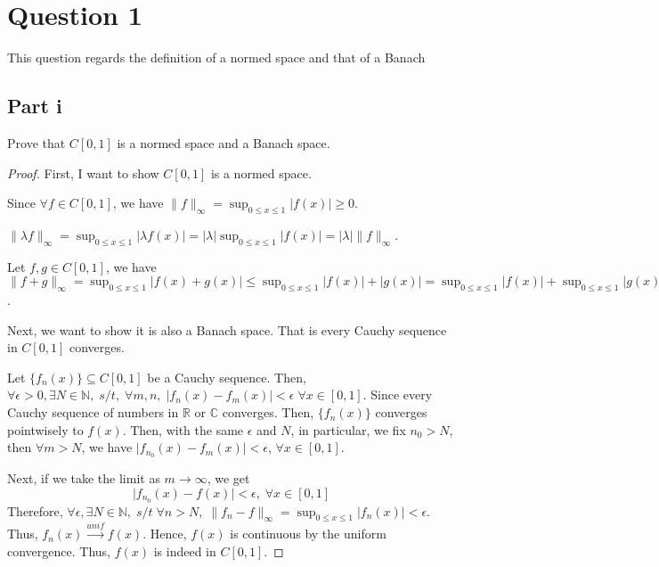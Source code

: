 \section{Question 1}

\begin{question}
    This question regards the definition of a normed space and that of a Banach
\end{question}

\subsection{Part i}

\begin{question}
    Prove that $C[0,1]$ is a normed space and a Banach space.
\end{question}

\begin{answer}
    \begin{proof}
        First, I want to show $C[0,1]$ is a normed space. 
        
        Since $\forall f \in C[0,1]$, we have $\lVert f \rVert_{\infty} = \sup_{0 \leq x \leq 1} \lvert f(x) \rvert \geq 0$.
        
        $\lVert \lambda f \rVert_{\infty} = \sup_{0 \leq x \leq 1}\lvert \lambda f(x) \rvert = \lvert \lambda \rvert \sup_{0 \leq x \leq 1}\lvert f(x) \rvert = \lvert \lambda \rvert \lVert f \rVert_{\infty}$. 
        
        Let $f,g \in C[0,1]$, we have $\lVert f + g \rVert_{\infty} = \sup_{0 \leq x \leq 1}\lvert f(x) + g(x) \rvert \leq \sup_{0 \leq x \leq 1}\lvert f(x) \rvert + \lvert g(x) \rvert = \sup_{0 \leq x \leq 1}\lvert f(x) \rvert + \sup_{0 \leq x \leq 1}\lvert g(x) \rvert = \lVert f \rVert_{\infty} + \lVert g \rVert_{\infty}$.
        
        Next, we want to show it is also a Banach space. That is every Cauchy sequence in $C[0,1]$ converges.
        
        Let $\{f_n(x)\} \subseteq C[0,1]$ be a Cauchy sequence. Then, $\forall \epsilon > 0, \exists N \in \mathbb{N}, \; s/t,\;\forall m,n, \;\lvert f_n(x) - f_m(x) \rvert < \epsilon \; \forall x\in [0,1]$. Since every Cauchy sequence of numbers in $\mathbb{R}$ or $\mathbb{C}$ converges. Then, $\{f_n(x)\}$ converges pointwisely to $f(x)$. Then, with the same $\epsilon$ and $N$, in particular, we fix $n_0> N$, then $\forall m > N$, we have $\lvert f_{n_0}(x) - f_m(x) \rvert < \epsilon$, $\forall x \in [0,1]$.
        
        Next, if we take the limit as $m \to \infty$, we get
        \begin{equation}
            \lvert f_{n_0}(x) - f(x) \rvert < \epsilon, \; \forall x \in [0,1]
        \end{equation}
        Therefore, $\forall \epsilon, \exists N \in \mathbb{N},\; s/t\; \forall n > N, \; \lVert f_n - f \rVert_{\infty} = \sup_{0 \leq x \leq 1}\lvert f_{n}(x) \rvert < \epsilon$. Thus, $f_n(x) \xrightarrow{unif} f(x)$. Hence, $f(x)$ is continuous by the uniform convergence. Thus, $f(x)$ is indeed in $C[0,1]$.
    \end{proof}
\end{answer}

